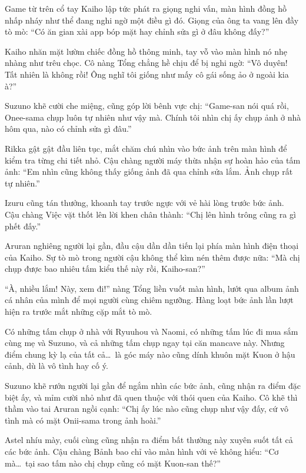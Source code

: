 \documentclass[../main.tex]{subfiles}
\begin{document}
Game từ trên cổ tay Kaiho lập tức phát ra giọng nghi vấn, màn hình đồng hồ nhấp nháy như thể đang nghi ngờ một điều gì đó. Giọng của ông ta vang lên đầy tò mò: ``Có ăn gian xài app bóp mặt hay chỉnh sửa gì ở đâu không đấy?''

Kaiho nhăn mặt lườm chiếc đồng hồ thông minh, tay vỗ vào màn hình nó nhẹ nhàng như trêu chọc. Cô nàng Tổng chẳng hề chịu để bị nghi ngờ: ``Vô duyên! Tất nhiên là không rồi! Ông nghĩ tôi giống như mấy cô gái sống ảo ở ngoài kia à?''

Suzuno khẽ cười che miệng, cũng góp lời bênh vực chị: ``Game-san nói quá rồi, Onee-sama chụp luôn tự nhiên như vậy mà. Chính tôi nhìn chị ấy chụp ảnh ở nhà hôm qua, nào có chỉnh sửa gì đâu.''

Rikka gật gật đầu liên tục, mắt chăm chú nhìn vào bức ảnh trên màn hình để kiểm tra từng chi tiết nhỏ. Cậu chàng người máy thừa nhận sự hoàn hảo của tấm ảnh: ``Em nhìn cũng không thấy giống ảnh đã qua chỉnh sửa lắm. Ảnh chụp rất tự nhiên.''

Izuru cũng tán thưởng, khoanh tay trước ngực với vẻ hài lòng trước bức ảnh. Cậu chàng Việc vặt thốt lên lời khen chân thành: ``Chị lên hình trông cũng ra gì phết đấy.''

Aruran nghiêng người lại gần, đầu cậu dần dần tiến lại phía màn hình điện thoại của Kaiho. Sự tò mò trong người cậu không thể kìm nén thêm được nữa: ``Mà chị chụp được bao nhiêu tấm kiểu thế này rồi, Kaiho-san?''

``À, nhiều lắm! Này, xem đi!'' nàng Tổng liền vuốt màn hình, lướt qua album ảnh cá nhân của mình để mọi người cùng chiêm ngưỡng. Hàng loạt bức ảnh lần lượt hiện ra trước mắt những cặp mắt tò mò.

Có những tấm chụp ở nhà với Ryuuhou và Naomi, có những tấm lúc đi mua sắm cùng mẹ và Suzuno, và cả những tấm chụp ngay tại căn mancave này. Nhưng điểm chung kỳ lạ của tất cả\dots\ là góc máy nào cũng dính khuôn mặt Kuon ở hậu cảnh, dù là vô tình hay cố ý.

Suzuno khẽ rướn người lại gần để ngắm nhìn các bức ảnh, cũng nhận ra điểm đặc biệt ấy, và mỉm cười nhỏ như đã quen thuộc với thói quen của Kaiho. Cô khẽ thì thầm vào tai Aruran ngồi cạnh: ``Chị ấy lúc nào cũng chụp như vậy đấy, cứ vô tình mà có mặt Onii-sama trong ảnh hoài.''

Astel nhíu mày, cuối cùng cũng nhận ra điểm bất thường này xuyên suốt tất cả các bức ảnh. Cậu chàng Bảnh bao chỉ vào màn hình với vẻ không hiểu: ``Cơ mà\dots\ tại sao tấm nào chị chụp cũng có mặt Kuon-san thế?''
\end{document}
